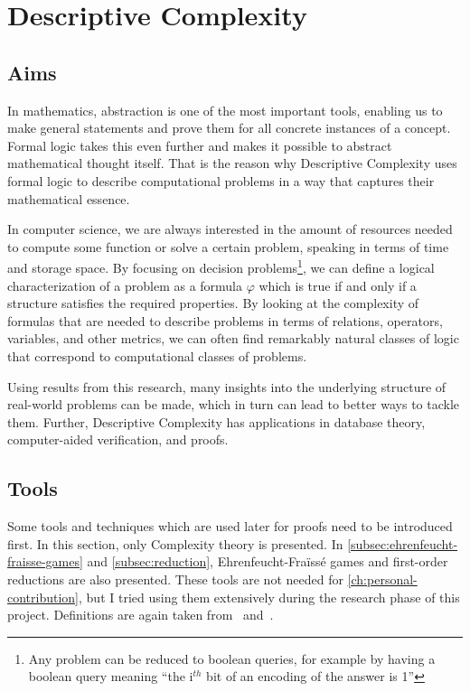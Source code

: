 

\chapter{Descriptive Complexity}\label{ch:descriptive-complexity}


\section{Aims}\label{sec:aims}

In mathematics, abstraction is one of the most important tools, enabling us to make general statements and prove them for all concrete instances of a concept.
Formal logic takes this even further and makes it possible to abstract mathematical thought itself.
That is the reason why {Descriptive} Complexity uses formal logic to describe computational problems in a way that captures their mathematical essence.

In computer science, we are always interested in the amount of resources needed to compute some function or solve a certain problem, speaking in terms of time and storage space.
By focusing on decision problems\footnote{Any problem can be reduced to boolean queries, for example by having a boolean query meaning ``the i$^{th}$ bit of an encoding of the answer is 1''}, we can define a logical characterization of a problem as a formula $\varphi$ which is true if and only if a structure satisfies the required properties.
By looking at the complexity of formulas that are needed to describe problems in terms of relations, operators, variables, and other metrics, we can often find remarkably natural classes of logic that correspond to computational classes of problems.

Using results from this research, many insights into the underlying structure of real-world problems can be made, which in turn can lead to better ways to tackle them.
Further, Descriptive Complexity has applications in database theory, computer-aided verification, and proofs.


\section{Tools}\label{sec:tools}

Some tools and techniques which are used later for proofs need to be introduced first.
In this section, only Complexity theory is presented.
In \cref{subsec:ehrenfeucht-fraisse-games} and \cref{subsec:reduction},   Ehrenfeucht-Fraïssé games and first-order reductions are also presented.
These tools are not needed for \cref{ch:personal-contribution}, but I tried using them extensively during the research phase of this project.
Definitions are again taken from~\cite{theory-cs} and~\cite{descriptive-complexity}.

